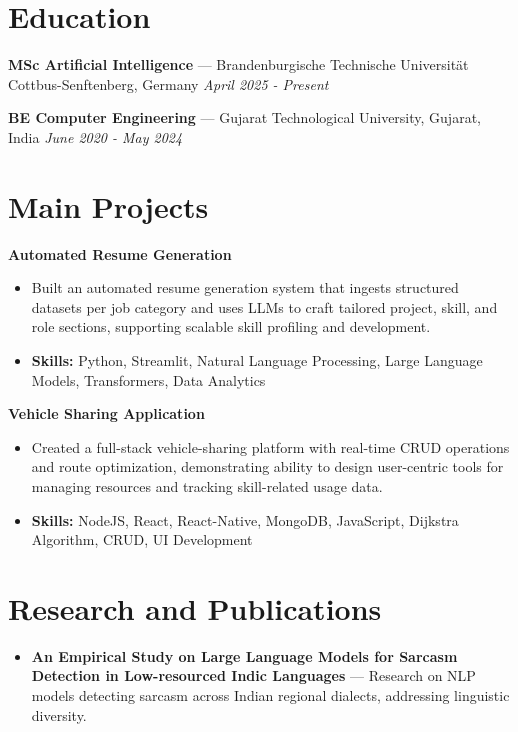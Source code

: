 \documentclass[a4paper,10pt]{article}
\begin{document}
\section*{Education}
\textbf{MSc Artificial Intelligence} — Brandenburgische Technische Universität Cottbus-Senftenberg, Germany \hfill \textit{April 2025 - Present}\par
\vspace{1.5pt}
\textbf{BE Computer Engineering} — Gujarat Technological University, Gujarat, India \hfill \textit{June 2020 - May 2024}\par

\section*{Main Projects}
\textbf{Automated Resume Generation}\par
\vspace{1pt}
\begin{itemize}
  \item Built an automated resume generation system that ingests structured datasets per job category and uses LLMs to craft tailored project, skill, and role sections, supporting scalable skill profiling and development.
  \item \textbf{Skills:} Python, Streamlit, Natural Language Processing, Large Language Models, Transformers, Data Analytics
\end{itemize}
\vspace{3pt}
\textbf{Vehicle Sharing Application}\par
\vspace{1pt}
\begin{itemize}
  \item Created a full-stack vehicle-sharing platform with real-time CRUD operations and route optimization, demonstrating ability to design user-centric tools for managing resources and tracking skill-related usage data.
  \item \textbf{Skills:} NodeJS, React, React-Native, MongoDB, JavaScript, Dijkstra Algorithm, CRUD, UI Development
\end{itemize}

\section*{Research and Publications}
\begin{itemize}
\item \textbf{An Empirical Study on Large Language Models for Sarcasm Detection in Low-resourced Indic Languages} — Research on NLP models detecting sarcasm across Indian regional dialects, addressing linguistic diversity.
\end{itemize}
\end{document}
